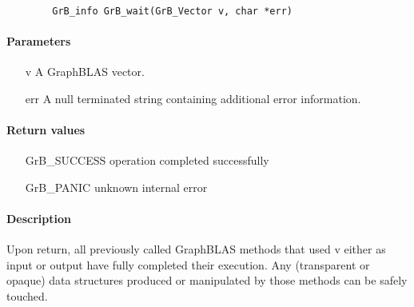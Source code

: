 {\paragraph{\syntax}

\begin{verbatim}
        GrB_info GrB_wait(GrB_Vector v, char *err)
\end{verbatim}

\paragraph{Parameters}

\begin{itemize}[leftmargin=1.1in]
	\item[{\sf v}]	     A GraphBLAS vector.
        \item[{\sf err}]     A null terminated string containing additional error
information.
\end{itemize}

\paragraph{Return values}
\begin{itemize}[leftmargin=2.1in]
\item[{\sf GrB\_SUCCESS}]	operation completed successfully
\item[{\sf GrB\_PANIC}]		unknown internal error
\end{itemize}

\paragraph{Description}

Upon return, all previously called GraphBLAS methods that used {\sf v} either as
input or output have fully completed their execution.  Any (transparent or opaque)
data structures produced or manipulated by those methods can be safely touched.
}
